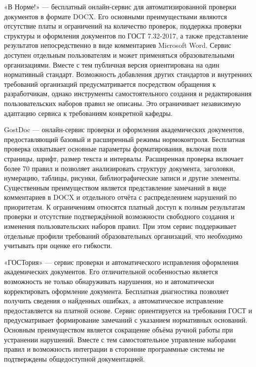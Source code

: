 \documentclass[a4paper,14pt]{extarticle}
\begin{document}
«В Норме!» — бесплатный онлайн-сервис для автоматизированной проверки документов в формате DOCX. Его основными преимуществами являются отсутствие платы и ограничений на количество проверок, поддержка проверки структуры и оформления документов по ГОСТ 7.32-2017, а также представление результатов непосредственно в виде комментариев Microsoft Word. Сервис доступен отдельным пользователям и может применяться образовательными организациями. Вместе с тем публичная версия ориентирована на один нормативный стандарт. Возможность добавления других стандартов и внутренних требований организаций предусматривается посредством обращения к разработчикам, однако инструменты самостоятельного создания и редактирования пользовательских наборов правил не описаны. Это ограничивает независимую адаптацию сервиса к требованиям конкретной кафедры.

GostDoc — онлайн-сервис проверки и оформления академических документов, предоставляющий базовый и расширенный режимы нормоконтроля. Бесплатная проверка охватывает основные параметры форматирования, включая поля страницы, шрифт, размер текста и интервалы. Расширенная проверка включает более 70 правил и позволяет анализировать структуру документа, заголовки, нумерацию, таблицы, рисунки, библиографические записи и другие элементы. Существенным преимуществом является представление замечаний в виде комментариев в DOCX и отдельного отчёта с распределением нарушений по приоритетам. К ограничениям относятся платный доступ к полным результатам проверки и отсутствие подтверждённой возможности свободного создания и изменения пользовательских наборов правил. При этом сервис поддерживает отдельные профили требований образовательных организаций, что необходимо учитывать при оценке его гибкости.

«ГОСТория» — сервис проверки и автоматического исправления оформления академических документов. Его отличительной особенностью является возможность не только обнаруживать нарушения, но и автоматически корректировать оформление документа. Бесплатная диагностика позволяет получить сведения о найденных ошибках, а автоматическое исправление предоставляется на платной основе. Сервис ориентируется на требования ГОСТ и предусматривает формирование замечаний с указанием нормативных оснований. Основным преимуществом является сокращение объёма ручной работы при устранении нарушений. Вместе с тем самостоятельное управление наборами правил и возможность интеграции в сторонние программные системы не подтверждены общедоступной документацией.
\end{document}
